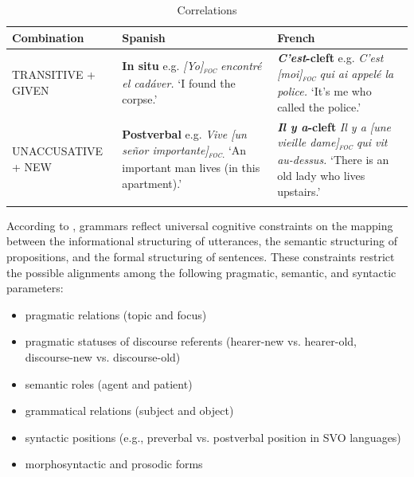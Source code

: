 \begin{table}
    \begin{tabularx}{\textwidth}{p{2.7cm}QQ@{}}
      \lsptoprule
      Combination & Spanish & French \\
      \midrule
      TRANSITIVE + GIVEN & \textbf{In situ}\newline
                          e.g. \textit{[Yo]\textsubscript{\textsc{foc}} encontré el cadáver.}\newline
                          `I found the corpse.' &
                              \textbf{\textit{C'est}-cleft}\newline
                              e.g. \textit{C'est [moi]\textsubscript{\textsc{foc}} qui ai appelé la police.}\newline
                              `It's me who called the police.'\\
\tablevspace
      UNACCUSATIVE + NEW & \textbf{Postverbal} \newline
                           e.g. \textit{Vive [un señor importante]\textsubscript{\textsc{foc.}}}\newline
                          `An important man lives (in this apartment).'&
                              \textbf{\textit{Il y a}-cleft} \newline
                              \textit{Il y a [une vieille dame]\textsubscript{\textsc{foc}} qui vit au-dessus.}\newline
                              `There is an old lady who lives upstairs.'\\
      \lspbottomrule
    \end{tabularx}
    \caption{Correlations}
      \label{tab:5:correlations}
    \end{table}

\noindent
According to \textcite{lambrecht2010constraints}, grammars reflect universal cognitive constraints on the mapping between the informational structuring of utterances, the semantic structuring of propositions, and the formal structuring of sentences. These constraints restrict the possible
alignments among the following pragmatic, semantic, and syntactic parameters:
\begin{itemize}
  \sloppy
    \item pragmatic relations (topic and focus)
    \item pragmatic statuses of discourse referents (hearer-new vs. hearer-old, dis\-course-new vs. discourse-old)
    \item semantic roles (agent and patient)
    \item grammatical relations (subject and object)
    \item syntactic positions (e.g., preverbal vs. postverbal position in SVO languages)
\item morphosyntactic and prosodic forms
\fussy
\end{itemize}


